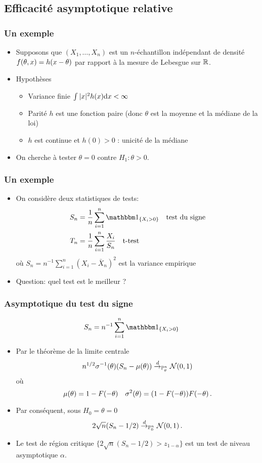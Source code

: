 \subsection{Efficacité asymptotique relative}
\begin{frame}
\frametitle{Un exemple}
\begin{itemize}
\item Supposons que $(X_1,\dots,X_n)$ est un $n$-échantillon indépendant de densité $f(\theta,x)= h(x-\theta)$ par rapport à la mesure de Lebesgue sur $\mathbb{R}$.
\item \alert{Hypothèses}
\begin{itemize}
\item Variance finie  $\int |x|^2 h(x) \mathrm{d} x < \infty$ 
\item Parité  $h$ est une fonction paire (donc $\theta$ est la moyenne et la médiane de la loi)
\item $h$ est continue et $h(0) > 0$ : unicité de la médiane
\end{itemize}
\item On cherche à tester $\theta= 0$ contre $H_1: \theta > 0$.
\end{itemize}
\end{frame}


\begin{frame}
\frametitle{Un exemple}
\begin{itemize}
\item On considère deux statistiques de tests:
\begin{align*}
S_n&= \frac{1}{n} \sum_{i=1}^n \indi{X_i > 0} \quad \text{test du signe} \\
T_n&= \frac{1}{n} \sum_{i=1}^n \frac{X_i}{S_n} \quad \text{t-test}
\end{align*}
où $S_n= n^{-1} \sum_{i=1}^n (X_i - \bar{X}_n)^2$ est la \alert{variance empirique}
\item \alert{Question:} quel test est le meilleur ?
\end{itemize}
\end{frame}

\begin{frame}
\frametitle{Asymptotique du test du signe}
$$
S_n= n^{-1} \sum_{i=1}^n \indi{X_i > 0} 
$$
\begin{itemize}
\item Par le théorème de la limite centrale
$$
n^{1/2} \sigma^{-1}(\theta) (S_n - \mu(\theta)) \stackrel{d}{\rightarrow}_{\operatorname{{\mathbb P}}^n_\theta} \mathcal{N}(0,1)
$$
où
\[
\mu(\theta) = 1 - F(-\theta) \quad \sigma^2(\theta) = (1-F(-\theta)) F(-\theta) \,.
\]
\item Par conséquent, sous $H_0= \theta = 0$
\[
2 \sqrt{n} (S_n - 1/2) \stackrel{d}{\rightarrow}_{\operatorname{{\mathbb P}}^n_0} \mathcal{N}(0,1) \,.
\]
\item Le test de région critique  $\{ 2 \sqrt{n} (S_n -1/2) > z_{ 1-\alpha} \}$ est un test de niveau asymptotique $\alpha$.
\end{itemize}
\end{frame}

